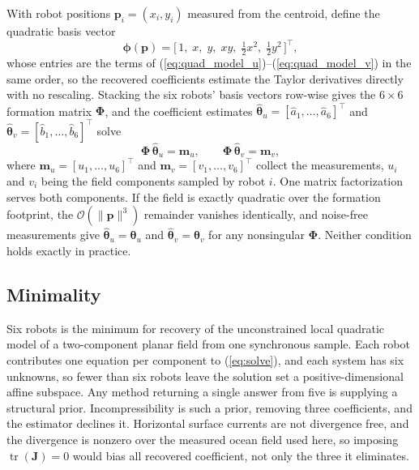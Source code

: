\documentclass[lettersize,journal]{IEEEtran}
\begin{document}
With robot positions $\mathbf{p}_i = (x_i, y_i)$ measured from the
centroid, define the quadratic basis vector
\begin{equation}
    \boldsymbol{\phi}(\mathbf{p}) =
    \bigl[\,1, \; x, \; y, \; xy, \;
    \tfrac{1}{2}x^2, \; \tfrac{1}{2}y^2\,\bigr]^\top,
\end{equation}
whose entries are the terms of
(\ref{eq:quad_model_u})--(\ref{eq:quad_model_v}) in the same order, so
the recovered coefficients estimate the Taylor derivatives directly with
no rescaling. Stacking the six robots' basis vectors row-wise gives
the $6 \times 6$ formation matrix $\boldsymbol{\Phi}$, and the coefficient
estimates $\hat{\boldsymbol{\theta}}_u = [\hat{a}_1, \ldots,
\hat{a}_6]^\top$ and $\hat{\boldsymbol{\theta}}_v = [\hat{b}_1, \ldots,
\hat{b}_6]^\top$ solve
\begin{equation}
    \boldsymbol{\Phi}\,\hat{\boldsymbol{\theta}}_u = \mathbf{m}_u, \qquad
    \boldsymbol{\Phi}\,\hat{\boldsymbol{\theta}}_v = \mathbf{m}_v,
    \label{eq:solve}
\end{equation}
where $\mathbf{m}_u = [u_1, \ldots, u_6]^\top$ and
$\mathbf{m}_v = [v_1, \ldots, v_6]^\top$ collect the measurements, $u_i$
and $v_i$ being the field components sampled by robot $i$. One matrix
factorization serves both components. If the field is exactly quadratic
over the formation footprint, the $\mathcal{O}(\|\mathbf{p}\|^3)$
remainder vanishes identically, and noise-free measurements give
$\hat{\boldsymbol{\theta}}_u = \boldsymbol{\theta}_u$ and
$\hat{\boldsymbol{\theta}}_v = \boldsymbol{\theta}_v$ for any nonsingular
$\boldsymbol{\Phi}$. Neither condition holds exactly in practice.

\subsection{Minimality}

Six robots is the minimum for recovery of the unconstrained local
quadratic model of a two-component planar field from one synchronous
sample. Each robot contributes one equation per component to
(\ref{eq:solve}), and each system has six unknowns, so fewer than six
robots leave the solution set a positive-dimensional affine subspace.
Any method returning a single answer from five is supplying a structural
prior. Incompressibility is such a
prior, removing three coefficients, and the estimator declines it.
Horizontal surface currents are not divergence free, and the divergence
is nonzero over the measured ocean field used here, so imposing
$\operatorname{tr}(\mathbf{J}) = 0$ would bias all recovered
coefficient, not only the three it eliminates.
\end{document}
